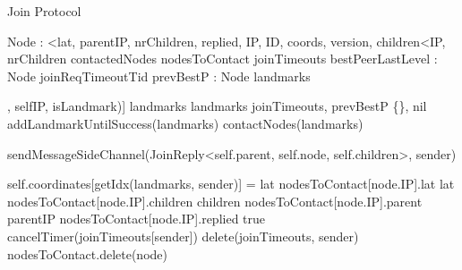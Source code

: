 
\begin{algorithm}{}
\caption{Join Protocol} \label{alg:memb:join}
\begin{algorithmic}[1]
    \asdtypes
        \State Node : <lat, parentIP, nrChildren, replied, IP, ID, coords, version, children<IP,  nrChildren\>\>
    \asdend
    \asdstate \label{alg:memb:join:state}
        \State contactedNodes 
        \State nodesToContact 
        \State joinTimeouts 
        \State bestPeerLastLevel : Node 
        \State joinReqTimeoutTid 
        \State prevBestP : Node 
        \State landmarks 
    \asdend

\asdupon[Init(landmarks : IP[], selfIP, isLandmark)] \label{alg:memb:join:init}
    \State landmarks \asdassign landmarks 
    \State joinTimeouts, prevBestP \asdassign \{\}, nil
    {addLandmarkUntilSuccess(landmarks) \label{alg:memb:join:add_land}} 
    {contactNodes(landmarks) \label{alg:memb:join:contact_landm}} 
\asdend


 \label{alg:memb:join:recv_join}
    \State sendMessageSideChannel(JoinReply<self.parent, self.node, self.children>, sender) 
\asdend
    
  \label{alg:memb:join:recv_join_reply}
                \State self.coordinates[getIdx(landmarks, sender)] = lat
            \EndIf
            \State nodesToContact[node.IP].lat \asdassign lat
            \State nodesToContact[node.IP].children \asdassign children
            \State nodesToContact[node.IP].parent \asdassign parentIP
            \State nodesToContact[node.IP].replied \asdassign true
            \State cancelTimer(joinTimeouts[sender])
            \State delete(joinTimeouts, sender)
        \Else
            \State nodesToContact.delete(node)
        \EndIf
\asdend


\end{algorithmic}
\end{algorithm}
